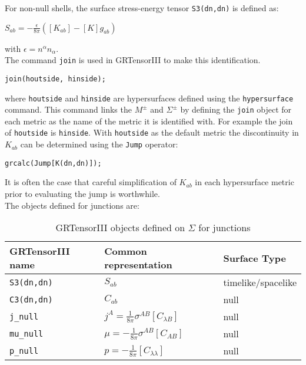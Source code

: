 \documentclass{article}
\begin{document}
For non-null shells, the surface stress-energy tensor \texttt{S3(dn,dn)} is defined as:
\begin{center}
$S_{ab} = - \frac{\epsilon}{8 \pi} \left( \left[K_{ab}\right] - \left[K\right]g_{ab} \right)$
\end{center}
with $\epsilon = n^\alpha n_\alpha$. \\

The command \texttt{join} is used in GRTensorIII to make this identification.
\begin{verbatim}
join(houtside, hinside);
\end{verbatim}
where \texttt{houtside} and \texttt{hinside} are hypersurfaces defined using the \texttt{hypersurface} command. This command
links the $M^\pm$ and $\Sigma^\pm$ by defining the \texttt{join} object for each metric as the name of the metric it is identified with. 
For example the join of \texttt{houtside} is \texttt{hinside}. With \texttt{houtside} as the default metric the discontinuity in $K_{ab}$ can be determined
using the \texttt{Jump} operator:
\begin{verbatim}
grcalc(Jump[K(dn,dn)]);
\end{verbatim}

It is often the case that careful simplification of $K_{ab}$ in each hypersurface metric prior to evaluating the jump is worthwhile. \\

The objects defined for junctions are:
\renewcommand{\arraystretch}{1.5}
\begin{table}[h]
  \begin{center}
    \begin{tabular}{lll}\hline\hline
      \textbf{GRTensorIII name} & \textbf{Common representation} & Surface Type \\ \hline
      \texttt{S3(dn,dn)}        & $S_{ab} $ & timelike/spacelike  \\
      \texttt{C3(dn,dn)}        & $C_{ab} $ & null \\
      \texttt{j\_null}   & $ j^A = \frac{1}{8 \pi} \sigma^{AB} \left[C_{\lambda B}\right]$ & null \\
      \texttt{mu\_null}   &$ \mu= - \frac{1}{8 \pi} \sigma^{AB} \left[C_{AB}\right]$ & null \\
      \texttt{p\_null}   &$ p = -\frac{1}{8 \pi} \left[C_{\lambda \lambda}\right]$ & null \\
    \end{tabular}
    \caption{GRTensorIII objects defined on $\Sigma$ for junctions}
    \label{tab:junc}
  \end{center}
\end{table}
\end{document}
